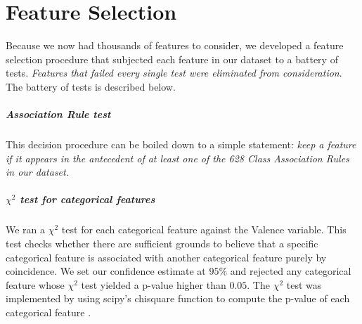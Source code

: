 \chapter{Feature Selection}\label{sec:selection}

Because we now had thousands of features to consider, we developed a
feature selection procedure that subjected each feature in our dataset to a battery of tests. \textit{Features that failed
every single  test were eliminated from consideration}.  
The battery of tests is described below.

\paragraph{Association Rule test} This decision procedure can be 
boiled down to a simple statement: \textit{keep a feature if it
appears in the antecedent of at least one of the 628 Class Association Rules
in our dataset.}

\paragraph{$\chi^2$ test for categorical features}
We ran a $\chi^2$ test \cite{chisquare} for each categorical feature against the
\textsf{Valence} variable.  This test checks whether there are sufficient
grounds to believe that a specific categorical feature is associated
with another categorical feature purely by coincidence.  We
 set our confidence estimate at $95\%$ and rejected any 
categorical feature whose $\chi^2$ test yielded a p-value higher than $0.05$.
The $\chi^2$ test was implemented by using \textsf{scipy}'s
\textsf{chisquare} function to compute the p-value of each categorical feature \cite{scipy}.


